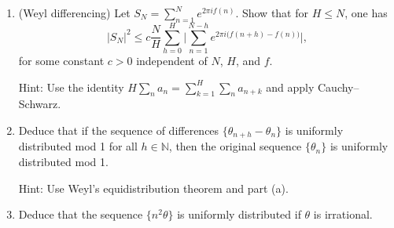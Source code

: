 \documentclass[a4paper]{article}
\begin{document}
\begin{enumerate}
\begin{enumerate}

\item (Weyl differencing) Let $S_N = \sum_{n=1}^N e^{2\pi i f(n)}$. Show that for $H\le N$, one has  $$ |S_N|^2 \le c \frac{N}{H}  \sum_{h=0}^H \bigg| \sum_{n=1}^{N-h} e^{2\pi i \big( f(n+h)  - f (n) \big)}  \bigg|,  $$ for some constant $c>0$  independent of $N$, $H$, and $f$.

Hint: Use the identity $H \sum_n a_n = \sum_{k=1}^H \sum_n a_{n+k}$ and apply Cauchy--Schwarz.

\item Deduce that if the  sequence of differences $\{ \theta_{n+h} - \theta_n \} $ is uniformly distributed mod 1 for all $h \in \mathbb N$, then the original sequence $\{ \theta_n \}$ is uniformly distributed mod 1.

Hint: Use Weyl's equidistribution theorem and part (a).

\item Deduce that the sequence $\{ n^2 \theta \}$ is uniformly distributed  if $\theta$ is irrational.


\end{enumerate}

\end{enumerate}
\end{document}
